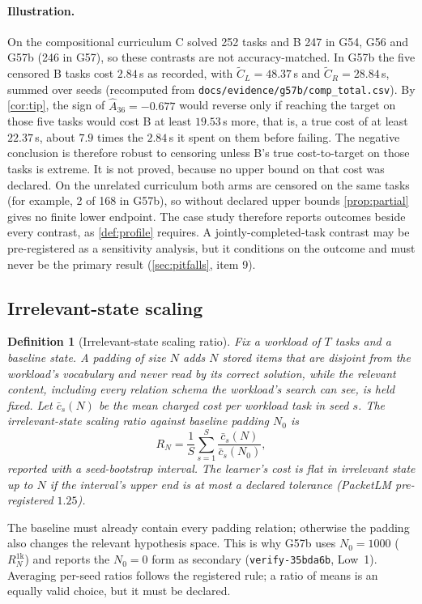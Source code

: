 \documentclass[11pt]{article}
\newtheorem{definition}{Definition}
\theoremstyle{remark}
\begin{document}
\paragraph{Illustration.} On the compositional curriculum C solved 252 tasks and B 247 in G54, G56 and G57b (246 in G57), so these contrasts are not accuracy-matched. In G57b the five censored B tasks cost $2.84$\,s as recorded, with $\tilde C_L=48.37$\,s and $\tilde C_R=28.84$\,s, summed over seeds (recomputed from \texttt{docs/evidence/g57b/comp\_total.csv}). By \cref{cor:tip}, the sign of $\hat A_{36}=-0.677$ would reverse only if reaching the target on those five tasks would cost B at least $19.53$\,s more, that is, a true cost of at least $22.37$\,s, about $7.9$ times the $2.84$\,s it spent on them before failing. The negative conclusion is therefore robust to censoring unless B's true cost-to-target on those tasks is extreme. It is not proved, because no upper bound on that cost was declared. On the unrelated curriculum both arms are censored on the same tasks (for example, 2 of 168 in G57b), so without declared upper bounds \cref{prop:partial} gives no finite lower endpoint. The case study therefore reports outcomes beside every contrast, as \cref{def:profile} requires. A jointly-completed-task contrast may be pre-registered as a sensitivity analysis, but it conditions on the outcome and must never be the primary result (\cref{sec:pitfalls}, item 9).

\subsection{Irrelevant-state scaling}\label{sec:scaling}
\begin{definition}[Irrelevant-state scaling ratio]\label{def:scaling}
Fix a workload of $T$ tasks and a baseline state. A \emph{padding} of size $N$ adds $N$ stored items that are disjoint from the workload's vocabulary and never read by its correct solution, while the relevant content, including every relation schema the workload's search can see, is held fixed. Let $\bar c_s(N)$ be the mean charged cost per workload task in seed $s$. The \emph{irrelevant-state scaling ratio} against baseline padding $N_0$ is
\[
R_N=\frac1S\sum_{s=1}^S\frac{\bar c_s(N)}{\bar c_s(N_0)},
\]
reported with a seed-bootstrap interval. The learner's cost is \emph{flat} in irrelevant state up to $N$ if the interval's upper end is at most a declared tolerance (PacketLM pre-registered $1.25$).
\end{definition}
The baseline must already contain every padding relation; otherwise the padding also changes the relevant hypothesis space. This is why G57b uses $N_0=1000$ ($R^{1\mathrm{k}}_N$) and reports the $N_0=0$ form as secondary (\texttt{verify-35bda6b}, Low~1). Averaging per-seed ratios follows the registered rule; a ratio of means is an equally valid choice, but it must be declared.
\end{document}
